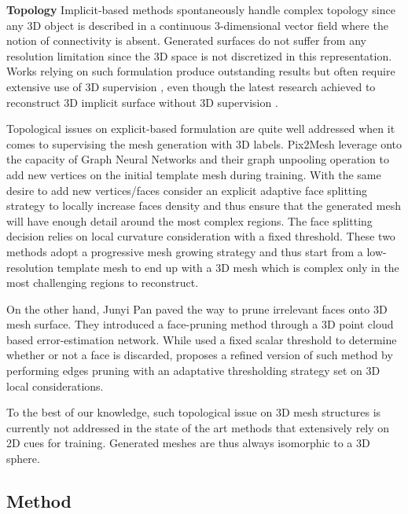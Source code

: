 \noindent\textbf{Topology} Implicit-based methods spontaneously handle complex topology since any 3D object is described in a continuous 3-dimensional vector field where the notion of connectivity is absent. Generated surfaces do not suffer from any resolution limitation since the 3D space is not discretized in this representation. Works relying on such formulation produce outstanding results but often require extensive use of 3D supervision \citep{saito2020pifuhd}, even though the latest research achieved to reconstruct 3D implicit surface without 3D supervision \citep{niemeyer2020differentiable,liu2019learning}. 

Topological issues on explicit-based formulation are quite well addressed when it comes to supervising the mesh generation with 3D labels. Pix2Mesh \citep{wang2018pixel2mesh} leverage onto the capacity of Graph Neural Networks and their graph unpooling operation to add new vertices on the initial template mesh during training. With the same desire to add new vertices/faces \citep{smith2019geometrics} consider an explicit adaptive face splitting strategy to locally increase faces density and thus ensure that the generated mesh will have enough detail around the most complex regions. The face splitting decision relies on local curvature consideration with a fixed threshold. These two methods adopt a progressive mesh growing strategy and thus start from a low-resolution template mesh to end up with a 3D mesh which is complex only in the most challenging regions to reconstruct.

On the other hand, Junyi Pan \etal \citep{pan2019deep} paved the way to prune irrelevant faces onto 3D mesh surface. They introduced a face-pruning method through a 3D point cloud based error-estimation network. While \citep{pan2019deep} used a fixed scalar threshold to determine whether or not a face is discarded, \citep{nie2020total3dunderstanding} proposes a refined version of such method by performing edges pruning with an adaptative thresholding strategy set on 3D local considerations.

To the best of our knowledge,  such topological issue on 3D mesh structures is currently not addressed in the state of the art methods that extensively rely on 2D cues for training. Generated meshes are thus always isomorphic to a 3D sphere.  

\subsection{Method}
\label{sec:method}

